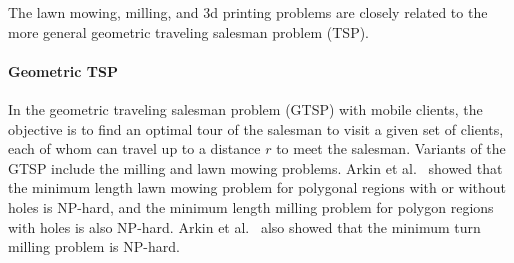 The lawn mowing, milling, and 3d printing problems are closely related to the more general geometric traveling salesman problem (TSP).

  \paragraph{Geometric TSP} \label{sec:geometricTSP}
  In the geometric traveling salesman problem (GTSP) with mobile clients, the objective is to find an optimal tour of the salesman to visit a given set of clients, each of whom can travel up to a distance $r$ to meet the salesman.
  Variants of the GTSP include the milling and lawn mowing problems. 
  Arkin et al.~\cite{ArFeMi2000} showed that the minimum length lawn mowing problem for polygonal regions with or without holes is NP-hard, and the minimum length milling problem for polygon regions with holes is also NP-hard.
  Arkin et al.~\cite{ArBeDeFeMiSe2005} also showed that the minimum turn milling problem is NP-hard.  
  
